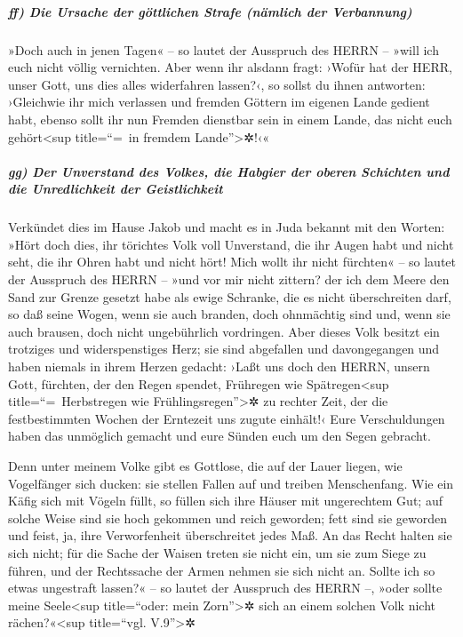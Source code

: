\hypertarget{ff-die-ursache-der-guxf6ttlichen-strafe-nuxe4mlich-der-verbannung}{%
\subparagraph{ff) Die Ursache der göttlichen Strafe (nämlich der
Verbannung)}\label{ff-die-ursache-der-guxf6ttlichen-strafe-nuxe4mlich-der-verbannung}}

»Doch auch in jenen Tagen« -- so lautet der Ausspruch des
HERRN -- »will ich euch nicht völlig vernichten. Aber
wenn ihr alsdann fragt: ›Wofür hat der HERR, unser Gott, uns dies alles
widerfahren lassen?‹, so sollst du ihnen antworten: ›Gleichwie ihr mich
verlassen und fremden Göttern im eigenen Lande gedient habt, ebenso
sollt ihr nun Fremden dienstbar sein in einem Lande, das nicht euch
gehört\textless sup title=``=~in fremdem Lande''\textgreater✲!‹«

\hypertarget{gg-der-unverstand-des-volkes-die-habgier-der-oberen-schichten-und-die-unredlichkeit-der-geistlichkeit}{%
\subparagraph{gg) Der Unverstand des Volkes, die Habgier der oberen
Schichten und die Unredlichkeit der
Geistlichkeit}\label{gg-der-unverstand-des-volkes-die-habgier-der-oberen-schichten-und-die-unredlichkeit-der-geistlichkeit}}

Verkündet dies im Hause Jakob und macht es in Juda
bekannt mit den Worten: »Hört doch dies, ihr törichtes
Volk voll Unverstand, die ihr Augen habt und nicht seht, die ihr Ohren
habt und nicht hört! Mich wollt ihr nicht fürchten« -- so
lautet der Ausspruch des HERRN -- »und vor mir nicht zittern? der ich
dem Meere den Sand zur Grenze gesetzt habe als ewige Schranke, die es
nicht überschreiten darf, so daß seine Wogen, wenn sie auch branden,
doch ohnmächtig sind und, wenn sie auch brausen, doch nicht ungebührlich
vordringen. Aber dieses Volk besitzt ein trotziges und
widerspenstiges Herz; sie sind abgefallen und davongegangen
und haben niemals in ihrem Herzen gedacht: ›Laßt uns doch
den HERRN, unsern Gott, fürchten, der den Regen spendet, Frühregen wie
Spätregen\textless sup title=``=~Herbstregen wie
Frühlingsregen''\textgreater✲ zu rechter Zeit, der die festbestimmten
Wochen der Erntezeit uns zugute einhält!‹ Eure
Verschuldungen haben das unmöglich gemacht und eure Sünden euch um den
Segen gebracht.

Denn unter meinem Volke gibt es Gottlose, die auf der
Lauer liegen, wie Vogelfänger sich ducken: sie stellen Fallen auf und
treiben Menschenfang. Wie ein Käfig sich mit Vögeln
füllt, so füllen sich ihre Häuser mit ungerechtem Gut; auf solche Weise
sind sie hoch gekommen und reich geworden; fett sind sie
geworden und feist, ja, ihre Verworfenheit überschreitet jedes Maß. An
das Recht halten sie sich nicht; für die Sache der Waisen treten sie
nicht ein, um sie zum Siege zu führen, und der Rechtssache der Armen
nehmen sie sich nicht an. Sollte ich so etwas ungestraft
lassen?« -- so lautet der Ausspruch des HERRN --, »oder sollte meine
Seele\textless sup title=``oder: mein Zorn''\textgreater✲ sich an einem
solchen Volk nicht rächen?«\textless sup title=``vgl. V.9''\textgreater✲

